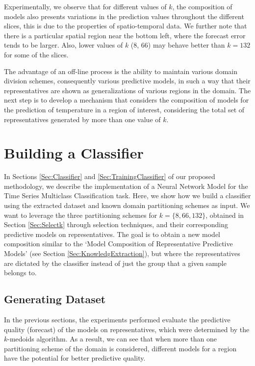 Experimentally, we observe that for different values of $k$, the composition of models also presents variations in the prediction values throughout the different slices, this is due to the properties of spatio-temporal data. We further note that there is a particular spatial region near the bottom left, where the forecast error tends to be larger. Also, lower values of $k$ (8, 66) may behave better than $k=132$ for some of the slices. 

The advantage of an off-line process is the ability to maintain various domain division schemes, consequently various predictive models, in such a way that their representatives are shown as generalizations of various regions in the domain. The next step is to develop a mechanism that considers the composition of models for the prediction of temperature in a region of interest, considering the total set of representatives generated by more than one value of $k$.

\section{Building a Classifier}
\label{Sec:ExperimentsTrainingClassifier}

In Sections \ref{Sec:Classifier} and \ref{Sec:TrainingClassifier} of our proposed methodology, we describe the implementation of a Neural Network Model for the Time Series Multiclass Classification task. Here, we show how we build a classifier using the extracted dataset and known domain partitioning schemes as input. We want to leverage the three partitioning schemes for $k = \{8, 66, 132\}$, obtained in Section \ref{Sec:Selectk} through selection techniques, and their corresponding predictive models on representatives. The goal is to obtain a new model composition similar to the `Model Composition of Representative Predictive Models' (see Section \ref{Sec:KnowledgExtraction}), but where the representatives are dictated by the classifier instead of just the group that a given sample belongs to. 

\subsection{Generating Dataset}
\label{Sec:ClassifierDataset}

In the previous sections, the experiments performed evaluate the predictive quality (forecast) of the models on representatives, which were determined by the $k$-medoids algorithm. As a result, we can see that when more than one partitioning scheme of the domain is considered, different models for a region have the potential for better predictive quality.

